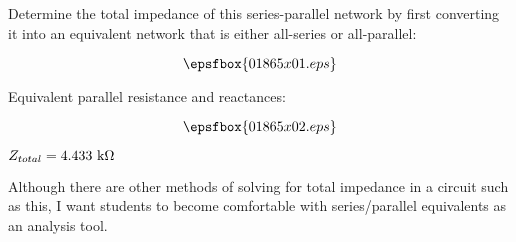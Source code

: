 

Determine the total impedance of this series-parallel network by first converting it into an equivalent network that is either all-series or all-parallel:

$$\epsfbox{01865x01.eps}$$







Equivalent parallel resistance and reactances:

$$\epsfbox{01865x02.eps}$$

$Z_{total} = 4.433 \hbox{ k}\Omega$







Although there are other methods of solving for total impedance in a circuit such as this, I want students to become comfortable with series/parallel equivalents as an analysis tool.




